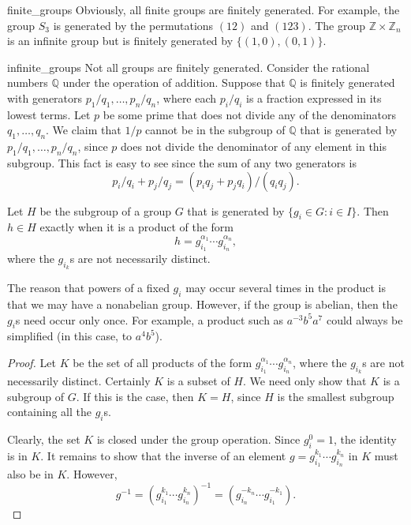  
\begin{example}{finite_groups}
Obviously, all finite groups are finitely generated. For example, the
group $S_3$ is generated by the permutations $(12)$ and $(123)$. The
group ${\mathbb Z} \times {\mathbb Z}_n$ is an infinite group but is
finitely generated by $\{ (1,0), (0,1) \}$.
\end{example}
 
 
 
\begin{example}{infinite_groups}
Not all groups are finitely generated.  Consider the rational numbers
${\mathbb Q}$ under the operation of addition. Suppose that ${\mathbb Q}$ is
finitely generated with generators $p_1/q_1, \ldots, p_n/q_n$, where
each $p_i/q_i$ is a fraction expressed in its lowest terms.  Let $p$
be some prime that does not divide any of the denominators $q_1,
\ldots, q_n$. We claim that $1/p$ cannot be in the subgroup of ${\mathbb
Q}$ that is generated by  $p_1/q_1, \ldots, p_n/q_n$, since $p$ does
not divide the denominator of any element in this subgroup. This fact
is easy to see since the sum of any two generators is
\[
p_i / q_i + p_j / q_j = (p_i q_j + p_j q_i)/(q_i q_j).
\]
\end{example}
 
 
\begin{theorem}
Let $H$ be the subgroup of a group $G$ that is generated by $\{ g_i
\in G : i \in I \}$. Then $h \in H$ exactly when it is a product of
the form 
\[
h = g_{i_1}^{\alpha_1} \cdots g_{i_n}^{\alpha_n},
\]
where the $g_{i_k}$s are not necessarily distinct.
\end{theorem}
 
 
The reason that powers of a fixed $g_i$ may occur several times in the
product is that we may have a nonabelian group. However, if the group
is abelian, then the $g_i$s need occur only once. For example, a
product such as $a^{-3} b^5 a^7$ could always be simplified (in this
case, to $a^4 b^5$). 
 
 
\medskip
 
 
\begin{proof}
Let $K$ be the set of all products of the form $g_{i_1}^{\alpha_1}
\cdots g_{i_n}^{\alpha_n}$, where the $g_{i_k}$s are not necessarily
distinct. Certainly $K$ is a subset of $H$.  We need only show that
$K$ is a subgroup of $G$. If this is the case, then $K=H$, since $H$ is
the smallest subgroup containing all the $g_i$s.
 
 
Clearly, the set $K$ is closed under the group operation. Since $g_i^0
=1$, the identity is in $K$. It remains to show that the inverse of an
element  $g =g_{i_1}^{k_1} \cdots g_{i_n}^{k_n}$ in $K$ must also be in
$K$. However, 
\[
g^{-1}
= (g_{i_1}^{k_{1}} \cdots g_{i_n}^{k_n})^{-1}
= (g_{i_n}^{-k_n} \cdots g_{i_{1}}^{-k_{1}}).
\]
\end{proof}

